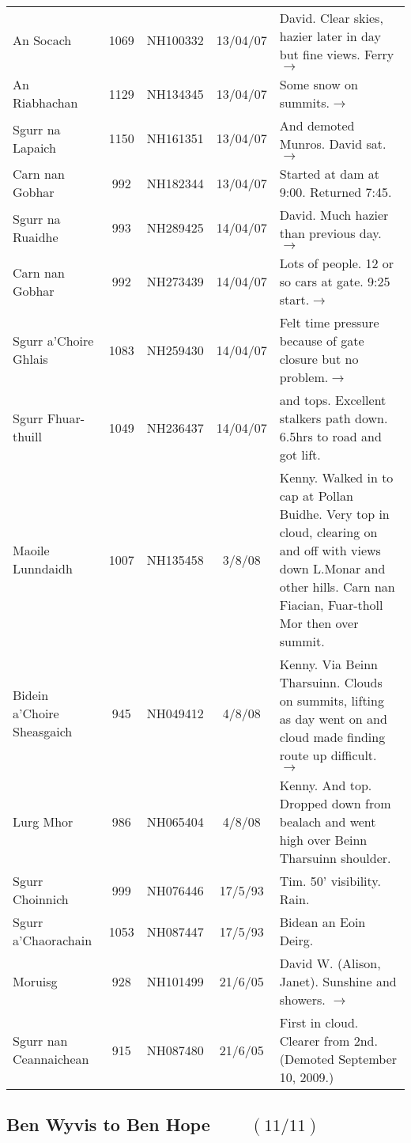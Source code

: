 \documentclass[10pt,a4paper]{article}
\begin{document}
\begin{tabular}{lcccp{6cm}}
An Socach & 1069 & NH100332 &13/04/07&David. Clear skies, hazier later in day but fine views. Ferry$\rightarrow$\\
An Riabhachan & 1129 & NH134345 &13/04/07&Some snow on summits.$\rightarrow$\\
Sgurr na Lapaich & 1150 & NH161351&13/04/07& And demoted Munros. David sat.$\rightarrow$\\
Carn nan Gobhar & 992 & NH182344&13/04/07& Started at dam at 9:00. Returned 7:45.\\
Sgurr na Ruaidhe & 993  & NH289425&14/04/07& David. Much hazier than previous day.$\rightarrow$ \\
Carn nan Gobhar & 992  & NH273439 &14/04/07&Lots of people. 12 or so cars at gate. 9:25 start.$\rightarrow$\\
Sgurr a'Choire Ghlais & 1083 & NH259430 &14/04/07&Felt time pressure because of gate closure but no problem.$\rightarrow$\\
Sgurr Fhuar-thuill & 1049  & NH236437&14/04/07& and tops. Excellent stalkers path down. 6.5hrs to road and got lift.\\
Maoile Lunndaidh  & 1007  & NH135458 &3/8/08&Kenny.
Walked in to cap at Pollan Buidhe. Very top in cloud, clearing on and off with views down L.Monar
and other hills. Carn nan Fiacian, Fuar-tholl Mor then over summit. \\
Bidein a'Choire Sheasgaich & 945  & NH049412  &4/8/08&Kenny. Via
Beinn Tharsuinn.
Clouds on summits, lifting as day went on and cloud made finding route up difficult. $\rightarrow$\\
Lurg Mhor & 986  & NH065404&4/8/08&Kenny. And top. Dropped down from
bealach and went high over
Beinn Tharsuinn shoulder. \\
Sgurr Choinnich & 999  & NH076446&17/5/93&Tim. 50' visibility. Rain.  \\
Sgurr a'Chaorachain & 1053  & NH087447 &17/5/93&Bidean an Eoin Deirg.   \\
Moruisg & 928 & NH101499 &21/6/05&David W. (Alison, Janet). Sunshine and showers. $\rightarrow$\\
Sgurr nan Ceannaichean & 915 & NH087480 & 21/6/05& First in cloud. Clearer from 2nd.
(Demoted September 10, 2009.) \\
\end{tabular}


\subsection*{Ben Wyvis to Ben Hope $\qquad (11/11)$}
\end{document}
